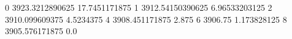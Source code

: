 0 3923.3212890625 17.7451171875
1 3912.54150390625 6.96533203125
2 3910.099609375 4.5234375
4 3908.451171875 2.875
6 3906.75 1.173828125
8 3905.576171875 0.0
